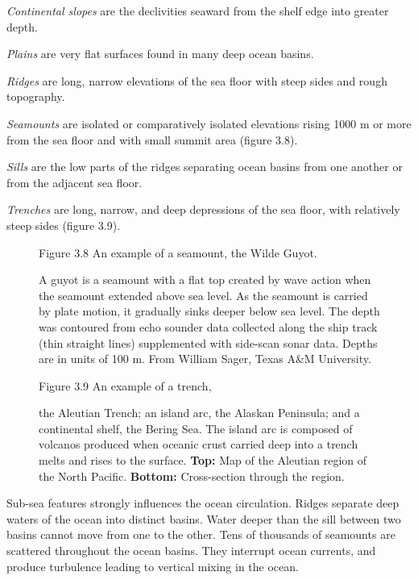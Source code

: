 \textit{Continental slopes} are the
declivities seaward from the shelf edge into greater depth.

\textit{Plains} are very flat surfaces found in
many deep ocean basins.

\textit{Ridges} are long, narrow elevations of
the sea floor with steep sides and rough topography.

\textit{Seamounts} are isolated or
comparatively isolated elevations rising 1000 m or more from the sea
floor and with small summit area (figure 3.8).

\textit{Sills} are the low parts of the ridges
separating ocean basins from one another or from the adjacent sea
floor.

\textit{Trenches} are long, narrow, and deep
depressions of the sea floor, with relatively steep sides (figure
3.9).

\begin{figure}[t!]
\footnotesize
Figure 3.8 An example of a seamount, the Wilde Guyot.\rule{0pt}{4ex}
A guyot is a seamount with a flat top created by wave action when the
seamount extended above sea level. As the seamount is carried by plate
motion, it gradually sinks deeper below sea level. The depth was
contoured from echo sounder data collected along the ship track (thin
straight lines) supplemented with side-scan sonar data. Depths are in
units of 100 m. From William Sager, Texas A\&M University.
\label{fig:wildeguyot}
\vspace{-3ex}
\end{figure}

\begin{figure}[t!]
\footnotesize
Figure 3.9 An example of a trench, \rule{0pt}{3ex}the Aleutian Trench;
an island arc, the Alaskan Peninsula; and a continental shelf, the
Bering Sea. The island arc is composed of volcanos produced when
oceanic crust carried deep into a trench melts and rises to the
surface. \textbf{Top:} Map of the Aleutian region of the North
Pacific. \textbf{Bottom:} Cross-section through the region.
\label{fig:aleutiantrench}
\vspace{-4ex}
\end{figure}

Sub-sea features strongly influences the ocean circulation.  Ridges
separate deep waters of the ocean into distinct basins. Water deeper
than the sill between two basins cannot move from one to
the other. Tens of thousands of seamounts are scattered throughout the
ocean basins. They interrupt ocean currents, and produce
turbulence leading to vertical
mixing in the ocean.

